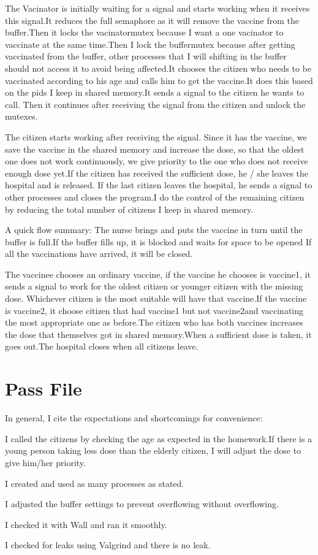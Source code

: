 \documentclass{article}
\begin{document}
The Vacinator is initially waiting for a signal and starts working when it receives this signal.It reduces the full semaphore as it will remove the vaccine from the buffer.Then it locks the vacinatormutex because I want a one vacinator to vaccinate at the same time.Then I lock the buffermutex because after getting vaccinated from the buffer, other processes that I will shifting in the buffer should not access it to avoid being affected.It chooses the citizen who needs to be vaccinated according to his age and calls him to get the vaccine.It does this based on the pids I keep in shared memory.It sends a signal to the citizen he wants to call. Then it continues after receiving the signal from the citizen and unlock the mutexes.


The citizen starts working after receiving the signal. Since it has the vaccine, we save the vaccine in the shared memory and increase the dose, so that the oldest one does not work continuously, we give priority to the one who does not receive enough dose yet.If the citizen has received the sufficient dose, he / she leaves the hospital and is released. If the last citizen leaves the hospital, he sends a signal to other processes and closes the program.I do the control of the remaining citizen by reducing the total number of citizens I keep in shared memory.

A quick flow summary:
    The nurse brings and puts the vaccine in turn until the buffer is full.If the buffer fills up, it is blocked and waits for space to be opened If all the vaccinations have arrived, it will be closed.
    
    The vaccinee chooses an ordinary vaccine, if the vaccine he chooses is vaccine1, it sends a signal to work for the oldest citizen or younger citizen with the missing dose. Whichever citizen is the most suitable will have that vaccine.If the vaccine is vaccine2, it choose citizen that had vaccine1 but not vaccine2and vaccinating the most appropriate one as before.The citizen who has both vaccines increases the dose that themselves got in shared memory.When a sufficient dose is taken, it goes out.The hospital closes when all citizens leave.





\section{Pass File}

In general, I cite the expectations and shortcomings for convenience:

I called the citizens by checking the age as expected in the homework.If there is a young person taking less dose than the elderly citizen, I will adjust the dose to give him/her priority.

I created and used as many processes as stated.

I adjusted the buffer settings to prevent overflowing without overflowing.

I checked it with Wall and ran it smoothly.

I checked for leaks using Valgrind and there is no leak.
\end{document}
